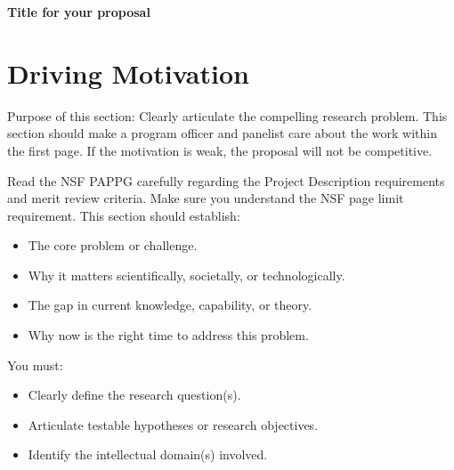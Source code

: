 \documentclass[11pt,letterpaper]{article}
\begin{document}
\setlength{\abovedisplayskip}{3pt}
\setlength{\belowdisplayskip}{3pt}


%


\begin{center}		
{\LARGE \textbf{Title for your proposal}}
\end{center}


\section{Driving Motivation}

Purpose of this section: Clearly articulate the compelling research problem. This section should make a program officer and panelist care about the work within the first page. If the motivation is weak, the proposal will not be competitive.

Read the NSF PAPPG carefully regarding the Project Description requirements and merit review criteria. Make sure you understand the NSF page limit requirement. This section should establish:
\begin{itemize}
    \item The core problem or challenge.
    \item Why it matters scientifically, societally, or technologically.
    \item The gap in current knowledge, capability, or theory.
    \item Why now is the right time to address this problem.
\end{itemize}
You must:
\begin{itemize}
    \item Clearly define the research question(s).
    \item Articulate testable hypotheses or research objectives.
    \item Identify the intellectual domain(s) involved.
\end{itemize}
\end{document}
